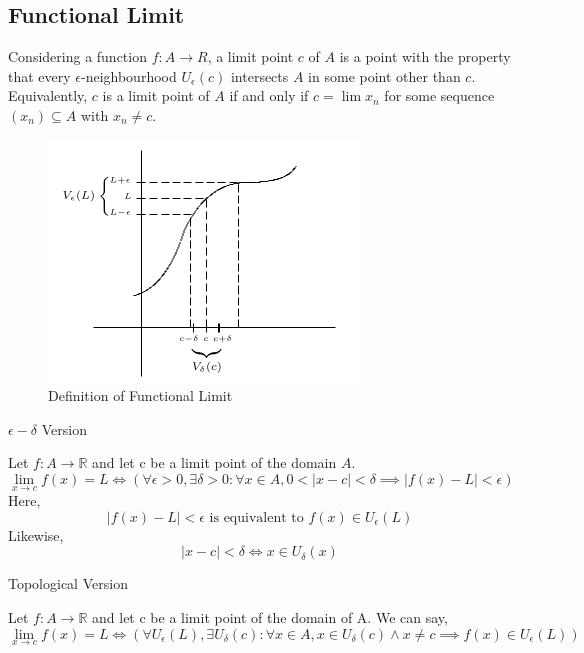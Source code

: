 \documentclass[12pt]{article}
\begin{document}
\subsection{Functional Limit}
Considering a function $f:A \to R$, a limit point $c$ of $A$ is a point with the property that every $\epsilon$-neighbourhood $U_\epsilon(c)$ intersects $A$ in some point other than $c$. Equivalently, $c$ is a limit point of $A$  if and only if $c=\lim x_n$ for some sequence $(x_n) \subseteq A$ with $x_n \neq c$. \\
\begin{figure}[htpb]
    \centering
    \includegraphics[scale=0.5]{Functional Limit Definition.png}
    \caption{\small Definition of Functional Limit}
\end{figure}

\begin{definition}{$\epsilon-\delta$ Version}

Let $f: A \to \mathbb{R}$ and let c be a limit point of the domain $A$. \[
    \lim_{x \to c} f(x) = L \iff (\forall \epsilon>0, \exists\delta>0 : \forall x \in A, 0 < |x-c| < \delta \implies |f(x)-L| < \epsilon)
\]
Here, \[
    |f(x)-L|<\epsilon \text{ is equivalent to } f(x) \in U_\epsilon(L)
\]
Likewise, \[
    |x-c|<\delta \iff x \in U_\delta(x)
\]
\end{definition}

\begin{definition}{Topological Version}

    Let $f : A \to \mathbb{R}$ and let c be a limit point of the domain of A. We can say, \[
        \lim_{x \to c} f(x)=L \iff ( \forall U_\epsilon(L), \exists U_\delta(c) : \forall x \in A, x \in U_\delta(c) \land x \neq c \implies f(x) \in U_\epsilon(L) )
    \] \\
\end{definition}
\end{document}
